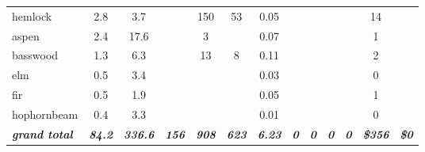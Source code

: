 \documentclass[landscape]{article}
\begin{document}
\begin{table}[H]
\begin{tabular}[t]{lcccccccccccc}
\rowcolor{gray!6}  hemlock & 2.8 & 3.7 &  & 150 & 53 & 0.05 &  &  &  &  & 14 & \\
 
aspen & 2.4 & 17.6 &  & 3 &  & 0.07 &  &  &  &  & 1 & \\
 
\rowcolor{gray!6}  basswood & 1.3 & 6.3 &  & 13 & 8 & 0.11 &  &  &  &  & 2 & \\
 
elm & 0.5 & 3.4 &  &  &  & 0.03 &  &  &  &  & 0 & \\
 
\rowcolor{gray!6}  fir & 0.5 & 1.9 &  &  &  & 0.05 &  &  &  &  & 1 & \\
 
hophornbeam & 0.4 & 3.3 &  &  &  & 0.01 &  &  &  &  & 0 & \\
 
\rowcolor{gray!6}  \rowcolor[HTML]{DCDCDC}  \em{\textbf{grand total}} & \em{\textbf{84.2}} & \em{\textbf{336.6}} & \em{\textbf{156}} & \em{\textbf{908}} & \em{\textbf{623}} & \em{\textbf{6.23}} & \em{\textbf{0}} & \em{\textbf{0}} & \em{\textbf{0}} & \em{\textbf{0}} & \em{\textbf{\$356}} & \em{\textbf{\$0}}\\
\bottomrule
\end{tabular}
\end{table}
\end{document}
